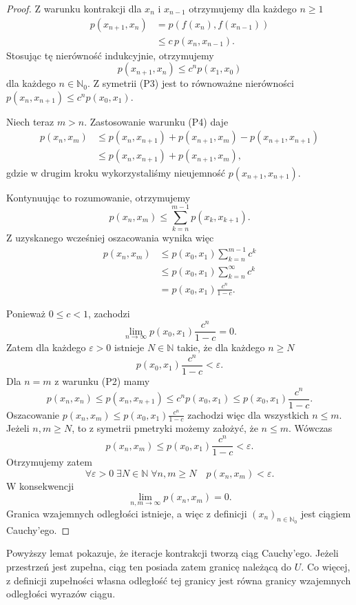 \documentclass[11pt,a4paper]{article}
\theoremstyle{definition}
\theoremstyle{plain}
\begin{document}
\begin{proof}
	Z warunku kontrakcji dla $x_n$ i $x_{n-1}$ otrzymujemy dla każdego
	$n\geq 1$
	\[
	\begin{aligned}
		p(x_{n+1},x_n)
		&=
		p(f(x_n),f(x_{n-1}))\\
		&\leq
		c\,p(x_n,x_{n-1}).
	\end{aligned}
	\]
	Stosując tę nierówność indukcyjnie, otrzymujemy
	\[
	p(x_{n+1},x_n)
	\leq
	c^n p(x_1,x_0)
	\]
	dla każdego $n\in\mathbb N_0$. Z symetrii (P3) jest to równoważne
	nierówności $p(x_n,x_{n+1})\leq c^n p(x_0,x_1)$.
	
	Niech teraz $m>n$. Zastosowanie warunku (P4) daje
	\[
	\begin{aligned}
		p(x_n,x_m)
		&\leq
		p(x_n,x_{n+1})
		+p(x_{n+1},x_m)
		-p(x_{n+1},x_{n+1})\\
		&\leq
		p(x_n,x_{n+1})+p(x_{n+1},x_m),
	\end{aligned}
	\]
	gdzie w drugim kroku wykorzystaliśmy nieujemność
	$p(x_{n+1},x_{n+1})$.
	
	Kontynuując to rozumowanie, otrzymujemy
	\[
	p(x_n,x_m)
	\leq
	\sum_{k=n}^{m-1}p(x_k,x_{k+1}).
	\]
	Z uzyskanego wcześniej oszacowania wynika więc
	\[
	\begin{aligned}
		p(x_n,x_m)
		&\leq
		p(x_0,x_1)\sum_{k=n}^{m-1}c^k\\
		&\leq
		p(x_0,x_1)\sum_{k=n}^{\infty}c^k\\
		&=
		p(x_0,x_1)\frac{c^n}{1-c}.
	\end{aligned}
	\]
	
	Ponieważ $0\leq c<1$, zachodzi
	\[
	\lim_{n\to\infty}
	p(x_0,x_1)\frac{c^n}{1-c}=0.
	\]
	Zatem dla każdego $\varepsilon>0$ istnieje $N\in\mathbb N$ takie,
	że dla każdego $n\geq N$
	\[
	p(x_0,x_1)\frac{c^n}{1-c}<\varepsilon.
	\]
	Dla $n=m$ z warunku (P2) mamy
	\[
	p(x_n,x_n)\leq p(x_n,x_{n+1})\leq c^n p(x_0,x_1)\leq p(x_0,x_1)\frac{c^n}{1-c}.
	\]
	Oszacowanie $p(x_n,x_m)\leq p(x_0,x_1)\frac{c^n}{1-c}$ zachodzi więc
	dla wszystkich $n\leq m$. Jeżeli $n,m\geq N$, to z symetrii pmetryki
	możemy założyć, że $n\leq m$. Wówczas
	\[
	p(x_n,x_m)
	\leq
	p(x_0,x_1)\frac{c^n}{1-c}
	<\varepsilon.
	\]
	Otrzymujemy zatem
	\[
	\forall\varepsilon>0\;\exists N\in\mathbb N\;
	\forall n,m\geq N\quad
	p(x_n,x_m)<\varepsilon.
	\]
	W konsekwencji
	\[
	\lim_{n,m\to\infty}p(x_n,x_m)=0.
	\]
	Granica wzajemnych odległości istnieje, a więc z definicji
	$(x_n)_{n\in\mathbb N_0}$ jest ciągiem Cauchy'ego.
\end{proof}

Powyższy lemat pokazuje, że iteracje kontrakcji tworzą ciąg Cauchy'ego.
Jeżeli przestrzeń jest zupełna, ciąg ten posiada zatem granicę należącą
do $U$. Co więcej, z definicji zupełności własna odległość tej granicy
jest równa granicy wzajemnych odległości wyrazów ciągu.
\end{document}
